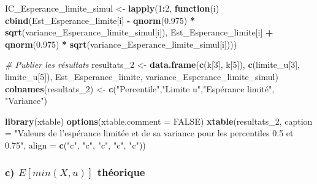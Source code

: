 \documentclass[]{article}
\newenvironment{Shaded}{\begin{snugshade}}{\end{snugshade}}
\newcommand{\KeywordTok}[1]{\textcolor[rgb]{0.13,0.29,0.53}{\textbf{#1}}}
\newcommand{\DataTypeTok}[1]{\textcolor[rgb]{0.13,0.29,0.53}{#1}}
\newcommand{\DecValTok}[1]{\textcolor[rgb]{0.00,0.00,0.81}{#1}}
\newcommand{\FloatTok}[1]{\textcolor[rgb]{0.00,0.00,0.81}{#1}}
\newcommand{\StringTok}[1]{\textcolor[rgb]{0.31,0.60,0.02}{#1}}
\newcommand{\CommentTok}[1]{\textcolor[rgb]{0.56,0.35,0.01}{\textit{#1}}}
\newcommand{\OtherTok}[1]{\textcolor[rgb]{0.56,0.35,0.01}{#1}}
\newcommand{\ControlFlowTok}[1]{\textcolor[rgb]{0.13,0.29,0.53}{\textbf{#1}}}
\newcommand{\OperatorTok}[1]{\textcolor[rgb]{0.81,0.36,0.00}{\textbf{#1}}}
\newcommand{\NormalTok}[1]{#1}
\begin{document}
\begin{Shaded}
\begin{Highlighting}[]
\NormalTok{IC_Esperance_limite_simul <-}\StringTok{ }\KeywordTok{lapply}\NormalTok{(}\DecValTok{1}\OperatorTok{:}\DecValTok{2}\NormalTok{, }\ControlFlowTok{function}\NormalTok{(i) }
                                \KeywordTok{cbind}\NormalTok{(Est_Esperance_limite[i] }\OperatorTok{-}\StringTok{ }\KeywordTok{qnorm}\NormalTok{(}\FloatTok{0.975}\NormalTok{) }\OperatorTok{*}\StringTok{ }
\StringTok{                                          }\KeywordTok{sqrt}\NormalTok{(variance_Esperance_limite_simul[i]),}
\NormalTok{                                    Est_Esperance_limite[i] }\OperatorTok{+}\StringTok{ }\KeywordTok{qnorm}\NormalTok{(}\FloatTok{0.975}\NormalTok{) }\OperatorTok{*}
\StringTok{                                        }\KeywordTok{sqrt}\NormalTok{(variance_Esperance_limite_simul[i])))}

\CommentTok{# Publier les résultats }
\NormalTok{resultats_}\DecValTok{2}\NormalTok{ <-}\StringTok{ }\KeywordTok{data.frame}\NormalTok{(}\KeywordTok{c}\NormalTok{(k[}\DecValTok{3}\NormalTok{], k[}\DecValTok{5}\NormalTok{]), }\KeywordTok{c}\NormalTok{(limite_u[}\DecValTok{3}\NormalTok{], limite_u[}\DecValTok{5}\NormalTok{]), }
\NormalTok{                          Est_Esperance_limite, variance_Esperance_limite_simul)}
\KeywordTok{colnames}\NormalTok{(resultats_}\DecValTok{2}\NormalTok{) <-}\StringTok{ }\KeywordTok{c}\NormalTok{(}\StringTok{"Percentile"}\NormalTok{,}\StringTok{"Limite u"}\NormalTok{,}\StringTok{"Espérance limité"}\NormalTok{, }\StringTok{"Variance"}\NormalTok{)}

\KeywordTok{library}\NormalTok{(xtable)}
\KeywordTok{options}\NormalTok{(}\DataTypeTok{xtable.comment =} \OtherTok{FALSE}\NormalTok{)}
\KeywordTok{xtable}\NormalTok{(resultats_}\DecValTok{2}\NormalTok{, }\DataTypeTok{caption =} \StringTok{"Valeurs de l'espérance limitée et de sa variance }
\StringTok{                 pour les percentiles 0.5 et 0.75"}\NormalTok{,  }
                 \DataTypeTok{align =} \KeywordTok{c}\NormalTok{(}\StringTok{"c"}\NormalTok{, }\StringTok{"c"}\NormalTok{, }\StringTok{"c"}\NormalTok{, }\StringTok{"c"}\NormalTok{, }\StringTok{"c"}\NormalTok{))}
\end{Highlighting}
\end{Shaded}

\subsubsection{\texorpdfstring{c) \(E[min(X,u)]\)
théorique}{c) E{[}min(X,u){]} théorique}}\label{c-eminxu-theorique}
\end{document}
